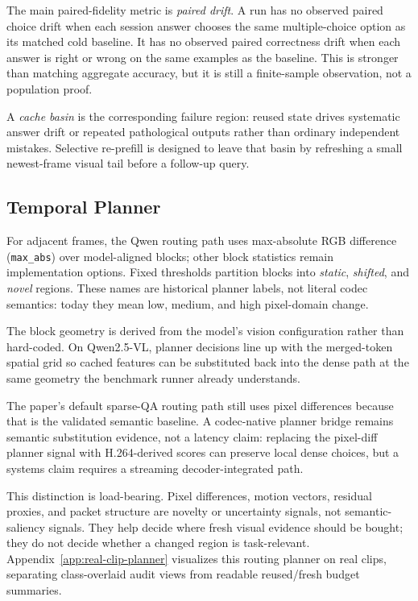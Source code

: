 The main paired-fidelity metric is \emph{paired drift}. A run has no observed paired
choice drift when each session answer chooses the same multiple-choice option
as its matched cold baseline. It has no observed paired correctness drift when
each answer is right or wrong on the same examples as the baseline. This is
stronger than matching aggregate accuracy, but it is still a finite-sample
observation, not a population proof.

A \emph{cache basin} is the corresponding failure region: reused state drives
systematic answer drift or repeated pathological outputs rather than ordinary
independent mistakes. Selective re-prefill is designed to leave that basin by
refreshing a small newest-frame visual tail before a follow-up query.

\subsection{Temporal Planner}

For adjacent frames, the Qwen routing path uses max-absolute RGB
difference (\texttt{max\_abs}) over model-aligned blocks; other block
statistics remain implementation options. Fixed
thresholds partition blocks into \emph{static}, \emph{shifted}, and
\emph{novel} regions. These names are historical planner labels, not literal
codec semantics: today they mean low, medium, and high pixel-domain change.

The block geometry is derived from the model's vision configuration rather than
hard-coded. On Qwen2.5-VL, planner decisions line up with the merged-token
spatial grid so cached features can be substituted back into the dense path at
the same geometry the benchmark runner already understands.

The paper's default sparse-QA routing path still uses pixel differences because
that is the validated semantic baseline. A codec-native planner bridge remains
semantic substitution evidence, not a latency claim: replacing the pixel-diff
planner signal with H.264-derived scores can preserve local dense choices, but
a systems claim requires a streaming decoder-integrated path.

This distinction is load-bearing. Pixel differences, motion vectors, residual
proxies, and packet structure are novelty or uncertainty signals, not
semantic-saliency signals. They help decide where fresh visual evidence should
be bought; they do not decide whether a changed region is task-relevant.
Appendix~\ref{app:real-clip-planner} visualizes this routing planner on real
clips, separating class-overlaid audit views from readable reused/fresh budget
summaries.

